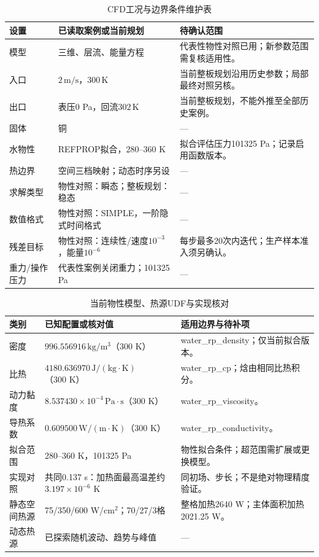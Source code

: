 \documentclass[UTF8]{midterm}
\begin{document}
\clearpage
\setcounter{section}{2}
\setcounter{figure}{1}
\clearpage
\setcounter{section}{2}
\setcounter{table}{3}
\begin{table}[!htbp]
\centering\small
\caption{CFD工况与边界条件维护表}\label{tab:03}
\begin{tabularx}{\linewidth}{lYY}
\toprule
{} 设置 & 已读取案例或当前规划 & 待确认范围 \\
\midrule
模型 & 三维、层流、能量方程 & 代表性物性对照已用；新参数范围需复核适用性。 \\
入口 & $2\,\mathrm{m/s}$，$300\,\mathrm K$ & 当前整板规划沿用历史参数；局部最终对照另核。 \\
出口 & 表压0 Pa，回流$302\,\mathrm K$ & 当前整板规划，不能外推至全部历史案例。 \\
固体 & 铜 & — \\
水物性 & REFPROP拟合，280--360 K & 拟合评估压力101325 Pa；记录启用函数版本。 \\
热边界 & 空间三档映射；动态时序另设 & — \\
求解类型 & 物性对照：瞬态；整板规划：稳态 & — \\
数值格式 & 物性对照：SIMPLE，一阶隐式时间格式 & — \\
残差目标 & 物性对照：连续性/速度$10^{-3}$，能量$10^{-6}$ & 每步最多20次内迭代；生产样本准入须另确认。 \\
重力/操作压力 & 代表性案例关闭重力；101325 Pa & — \\
\bottomrule
\end{tabularx}
\end{table}
\clearpage
\setcounter{section}{2}
\setcounter{table}{4}
\begin{table}[!htbp]
\centering\small
\caption{当前物性模型、热源UDF与实现核对}\label{tab:05}
\begin{tabularx}{\linewidth}{lYY}
\toprule
{} 类别 & 已知配置或核对值 & 适用边界与待补项 \\
\midrule
密度 & $996.556916\,\mathrm{kg/m^3}$（300 K） & water\_rp\_density；仅当前拟合版本。 \\
比热 & $4180.636970\,\mathrm{J/(kg\cdot K)}$（300 K） & water\_rp\_cp；焓由相同比热积分。 \\
动力黏度 & $8.537430\times10^{-4}\,\mathrm{Pa\cdot s}$（300 K） & water\_rp\_viscosity。 \\
导热系数 & $0.609500\,\mathrm{W/(m\cdot K)}$（300 K） & water\_rp\_conductivity。 \\
拟合范围 & 280--360 K，101325 Pa & 物性拟合条件；超范围需扩展或更换模型。 \\
实现对照 & 共同0.137 s：加热面最高温差约$3.197\times10^{-6}$ K & 同初场、步长；不是绝对物理精度验证。 \\
静态空间热源 & 75/350/600 W/cm$^2$；70/27/3格 & 整格加热2640 W；主体面积加热2021.25 W。 \\
动态热源 & 已探索随机波动、趋势与峰值 & — \\
\bottomrule
\end{tabularx}
\end{table}
\end{document}
